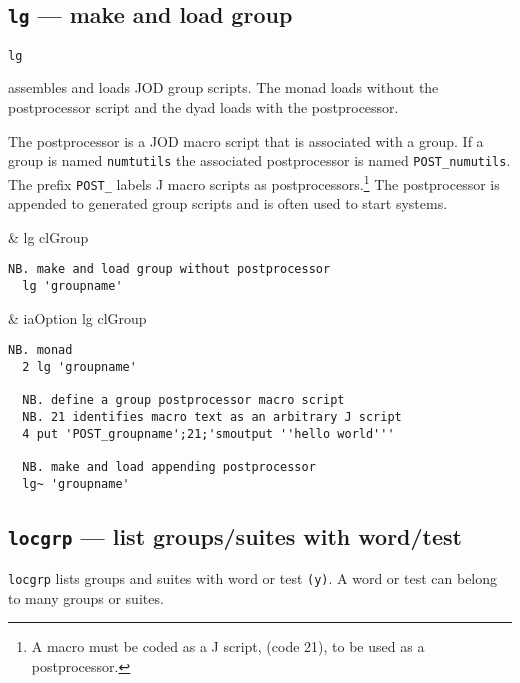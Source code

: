 \subsection{\texttt{lg} ---  make and load group}\label{ss:lg}

\hypertarget{il:lg}{\texttt{lg}} assembles 
and loads JOD group scripts.  The monad loads without the postprocessor 
script and the dyad loads with the postprocessor.

The postprocessor is a JOD macro script that is associated with a group.
If a group is named \texttt{numtutils} the associated postprocessor 
is named \verb|POST_numutils|. The prefix \verb|POST_| labels J macro scripts as postprocessors.\footnote{A macro
must be coded as a J script, (code 21), to be used as a postprocessor.
} The postprocessor is appended to generated group scripts and is often used to start systems.

\begin{wordhead}
\monad & lg clGroup \\
\end{wordhead}
\begin{lstlisting}[frame=single,framerule=0pt] 
  NB. make and load group without postprocessor 
  lg 'groupname'
\end{lstlisting}

\begin{wordhead}
\dyad & iaOption lg clGroup \\
\end{wordhead}
\begin{lstlisting}[frame=single,framerule=0pt] 
  NB. monad
  2 lg 'groupname' 

  NB. define a group postprocessor macro script
  NB. 21 identifies macro text as an arbitrary J script
  4 put 'POST_groupname';21;'smoutput ''hello world'''

  NB. make and load appending postprocessor
  lg~ 'groupname' 
\end{lstlisting}


\subsection{\texttt{locgrp} --- list groups/suites with word/test}\label{ss:locgrp}

\texttt{locgrp} lists groups and suites with word or test \texttt{(y)}.   
A word or test can belong to many groups or suites. 

